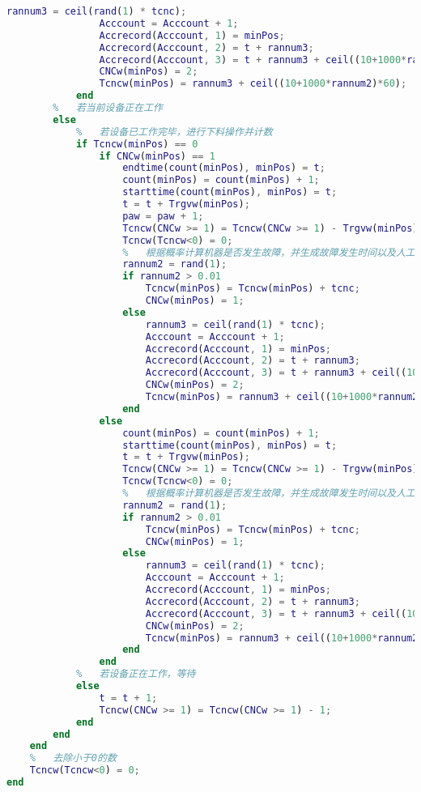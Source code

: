 \documentclass[no-math,withoutpreface,bwprint]{cumcmthesis} %
\numberwithin{equation}{section}
\numberwithin{figure}{section}
\numberwithin{table}{section}
\begin{document}
\begin{lstlisting}[language=matlab]
                rannum3 = ceil(rand(1) * tcnc);
                Acccount = Acccount + 1;
                Accrecord(Acccount, 1) = minPos;
                Accrecord(Acccount, 2) = t + rannum3;
                Accrecord(Acccount, 3) = t + rannum3 + ceil((10+1000*rannum2)*60);
                CNCw(minPos) = 2;
                Tcncw(minPos) = rannum3 + ceil((10+1000*rannum2)*60);
            end
        %   若当前设备正在工作
        else
            %   若设备已工作完毕，进行下料操作并计数
            if Tcncw(minPos) == 0
                if CNCw(minPos) == 1
                    endtime(count(minPos), minPos) = t;
                    count(minPos) = count(minPos) + 1;
                    starttime(count(minPos), minPos) = t;
                    t = t + Trgvw(minPos);
                    paw = paw + 1;
                    Tcncw(CNCw >= 1) = Tcncw(CNCw >= 1) - Trgvw(minPos);
                    Tcncw(Tcncw<0) = 0;
                    %   根据概率计算机器是否发生故障，并生成故障发生时间以及人工修复时间
                    rannum2 = rand(1);
                    if rannum2 > 0.01
                        Tcncw(minPos) = Tcncw(minPos) + tcnc;
                        CNCw(minPos) = 1;
                    else
                        rannum3 = ceil(rand(1) * tcnc);
                        Acccount = Acccount + 1;
                        Accrecord(Acccount, 1) = minPos;
                        Accrecord(Acccount, 2) = t + rannum3;
                        Accrecord(Acccount, 3) = t + rannum3 + ceil((10+1000*rannum2)*60);
                        CNCw(minPos) = 2;
                        Tcncw(minPos) = rannum3 + ceil((10+1000*rannum2)*60);
                    end
                else
                    count(minPos) = count(minPos) + 1;
                    starttime(count(minPos), minPos) = t;
                    t = t + Trgvw(minPos);
                    Tcncw(CNCw >= 1) = Tcncw(CNCw >= 1) - Trgvw(minPos);
                    Tcncw(Tcncw<0) = 0;
                    %   根据概率计算机器是否发生故障，并生成故障发生时间以及人工修复时间
                    rannum2 = rand(1);
                    if rannum2 > 0.01
                        Tcncw(minPos) = Tcncw(minPos) + tcnc;
                        CNCw(minPos) = 1;
                    else
                        rannum3 = ceil(rand(1) * tcnc);
                        Acccount = Acccount + 1;
                        Accrecord(Acccount, 1) = minPos;
                        Accrecord(Acccount, 2) = t + rannum3;
                        Accrecord(Acccount, 3) = t + rannum3 + ceil((10+1000*rannum2)*60);
                        CNCw(minPos) = 2;
                        Tcncw(minPos) = rannum3 + ceil((10+1000*rannum2)*60);
                    end
                end
            %   若设备正在工作，等待
            else 
                t = t + 1;
                Tcncw(CNCw >= 1) = Tcncw(CNCw >= 1) - 1;
            end
        end
    end
    %   去除小于0的数
    Tcncw(Tcncw<0) = 0;
end


\end{lstlisting}
\end{document}
